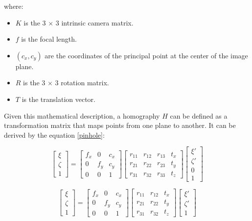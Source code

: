 where:
\begin{itemize}
    \item $K$ is the 3 $\times$ 3 intrinsic camera matrix.
    \item $f$ is the focal length.
    \item $(c_x,c_y)$ are the coordinates of the principal point at the center of the image plane.
    \item $R$ is the 3 $\times$ 3 rotation matrix.
    \item $T$ is the translation vector.
    
\end{itemize}

Given this  mathematical description, a homography $H$ can be defined as a transformation matrix that maps points from one plane to another. It can be derived by the equation \ref{pinhole}:

\begin{equation}
    \begin{bmatrix} \xi\\ \zeta\\ 1 \end{bmatrix} = \begin{bmatrix}
        f_x & 0   & c_x\\ 
        0   & f_y & c_y \\ 
        0   & 0   & 1 
        \end{bmatrix}
        \begin{bmatrix}
        r_{11}& r_{12} & r_{13} & t_{x} \\ 
        r_{21}& r_{22} & r_{23} & t_{y} \\
        r_{31}& r_{32} & r_{33} & t_{z}
        \end{bmatrix}
        \begin{bmatrix} \xi'\\ \zeta'\\ 0 \\ 1 \end{bmatrix}
\end{equation}

\begin{equation}
    \begin{bmatrix} \xi\\ \zeta\\ 1 \end{bmatrix} = \begin{bmatrix}
        f_x & 0   & c_x\\ 
        0   & f_y & c_y \\ 
        0   & 0   & 1 
        \end{bmatrix}
        \begin{bmatrix}
        r_{11}& r_{12} & t_{x} \\ 
        r_{21}& r_{22} & t_{y} \\
        r_{31}& r_{32} & t_{z}
        \end{bmatrix}
        \begin{bmatrix} \xi'\\ \zeta'\\ 1 \end{bmatrix}
\end{equation}

